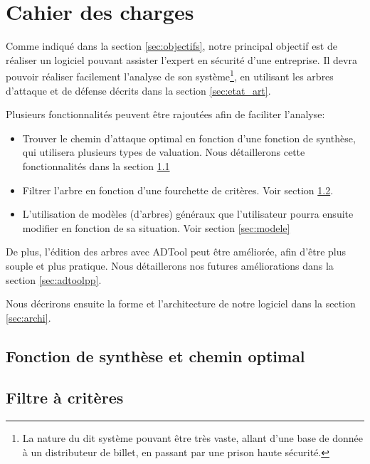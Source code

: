 \section{Cahier des charges}
    \label{sec:cahier}


    Comme indiqué dans la section \ref{sec:objectifs}, notre principal objectif est de réaliser un logiciel pouvant assister l'expert en sécurité d'une entreprise. Il devra pouvoir réaliser facilement l'analyse de son système\footnote{La nature du dit système pouvant être très vaste, allant d'une base de donnée à un distributeur de billet, en passant par une prison haute sécurité.}, en utilisant les arbres d'attaque et de défense décrits dans la section \ref{sec:etat_art}.

    Plusieurs fonctionnalités peuvent être rajoutées afin de faciliter l'analyse:
    \begin{itemize}
        \item Trouver le chemin d'attaque optimal en fonction d'une fonction de synthèse, qui utilisera plusieurs types de valuation. Nous détaillerons cette fonctionnalités dans la section \ref{sec:fct_synth}
        \item Filtrer l'arbre en fonction d'une fourchette de critères. Voir section \ref{sec:filtre}.
        \item L'utilisation de modèles (d'arbres) généraux que l'utilisateur pourra ensuite modifier en fonction de sa situation. Voir section \ref{sec:modele}
    \end{itemize}

    De plus, l'édition des arbres avec ADTool peut être améliorée, afin d'être plus souple et plus pratique. Nous détaillerons nos futures améliorations dans la section \ref{sec:adtoolpp}.

    Nous décrirons ensuite la forme et l'architecture de notre logiciel dans la section \ref{sec:archi}.

    \subsection{Fonction de synthèse et chemin optimal}
        \label{sec:fct_synth}


    \subsection{Filtre à critères}
        \label{sec:filtre}


